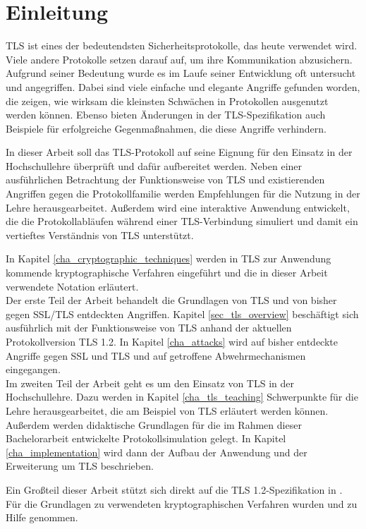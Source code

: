 \chapter{Einleitung}


TLS ist eines der bedeutendsten Sicherheitsprotokolle, das heute verwendet wird. Viele andere Protokolle setzen darauf auf, um ihre Kommunikation abzusichern. Aufgrund seiner Bedeutung wurde es im Laufe seiner Entwicklung oft untersucht und angegriffen. Dabei sind viele einfache und elegante Angriffe gefunden worden, die zeigen, wie wirksam die kleinsten Schwächen in Protokollen ausgenutzt werden können. Ebenso bieten Änderungen in der TLS-Spezifikation auch Beispiele für erfolgreiche Gegenmaßnahmen, die diese Angriffe verhindern.


In dieser Arbeit soll das TLS-Protokoll auf seine Eignung für den Einsatz in der Hochschullehre überprüft und dafür aufbereitet werden. 
Neben einer ausführlichen Betrachtung der Funktionsweise von TLS und existierenden Angriffen gegen die Protokollfamilie werden Empfehlungen für die Nutzung in der Lehre herausgearbeitet. Außerdem wird eine interaktive Anwendung entwickelt, die die Protokollabläufen während einer TLS-Verbindung simuliert und damit ein vertieftes Verständnis von TLS unterstützt.

In Kapitel \ref{cha_cryptographic_techniques} werden in TLS zur Anwendung kommende kryptographische Verfahren eingeführt und die in dieser Arbeit verwendete Notation erläutert. \\
Der erste Teil der Arbeit behandelt die Grundlagen von TLS und von bisher gegen SSL/TLS entdeckten Angriffen. Kapitel \ref{sec_tls_overview} beschäftigt sich ausführlich mit der Funktionsweise von TLS anhand der aktuellen Protokollversion TLS 1.2. In Kapitel \ref{cha_attacks} wird auf bisher entdeckte Angriffe gegen SSL und TLS und auf getroffene Abwehrmechanismen eingegangen.\\
Im zweiten Teil der Arbeit geht es um den Einsatz von TLS in der Hochschullehre. Dazu werden in Kapitel \ref{cha_tls_teaching} Schwerpunkte für die Lehre herausgearbeitet, die am Beispiel von TLS erläutert werden können. Außerdem werden didaktische Grundlagen für die im Rahmen dieser Bachelorarbeit entwickelte Protokollsimulation gelegt. In Kapitel \ref{cha_implementation} wird dann der Aufbau der Anwendung und der Erweiterung um TLS beschrieben.

Ein Großteil dieser Arbeit stützt sich direkt auf die TLS 1.2-Spezifikation in \cite{tls12}. Für die Grundlagen zu verwendeten kryptographischen Verfahren wurden \cite{Schneier2006} und \cite{ferguson10} zu Hilfe genommen. 
